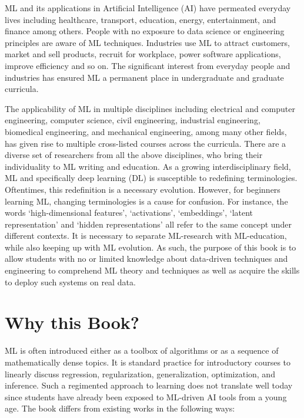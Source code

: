 \documentclass{article}
\begin{document}
ML and its applications in Artificial Intelligence (AI) have permeated everyday lives including healthcare, transport, education, energy, entertainment, and finance among others. People with no exposure to data science or engineering principles are aware of ML techniques. Industries use ML to attract customers, market and sell products, recruit for workplace, power software applications, improve efficiency and so on. The significant interest from everyday people and industries has ensured ML a permanent place in undergraduate and graduate curricula.  

The applicability of ML in multiple disciplines including electrical and computer engineering, computer science, civil engineering, industrial engineering, biomedical engineering, and mechanical engineering, among many other fields, has given rise to multiple cross-listed courses across the curricula. There are a diverse set of researchers from all the above disciplines, who bring their individuality to ML writing and education. As a growing interdisciplinary field, ML and specifically deep learning (DL) is susceptible to redefining terminologies. Oftentimes, this redefinition is a necessary evolution. However, for beginners learning ML, changing terminologies is a cause for confusion. For instance, the words ‘high-dimensional features’, ‘activations’, ‘embeddings’, ‘latent representation’ and ‘hidden representations’ all refer to the same concept under different contexts. It is necessary to separate ML-research with ML-education, while also keeping up with ML evolution. As such, the purpose of this book is to allow students with no or limited knowledge about data-driven techniques and engineering to comprehend ML theory and techniques as well as acquire the skills to deploy such systems on real data.

\section{Why this Book?}

ML is often introduced either as a toolbox of algorithms or as a sequence of mathematically dense topics. It is standard practice for introductory courses to linearly discuss regression, regularization, generalization, optimization, and inference. Such a regimented approach to learning does not translate well today since students have already been exposed to ML-driven AI tools from a young age. The book differs from existing works in the following ways:
\end{document}
